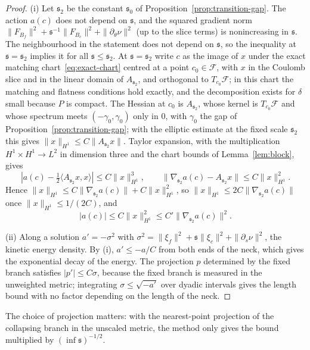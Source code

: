 \documentclass[11pt]{amsart}
\theoremstyle{definition}
\theoremstyle{remark}
\theoremstyle{plain}
\numberwithin{equation}{section}
\newcommand{\cF}{\mathcal{F}}
\begin{document}
\begin{proof}
(i) Let ${\mathfrak s}_2$ be the constant ${\mathfrak s}_0$ of Proposition~\ref{prop:transition-gap}.
The action $a(c)$ does not depend on ${\mathfrak s}$, and the squared gradient norm
$\|F_{B_f}\|^2+{\mathfrak s}^{-1}\|F_{B_c}\|^2+\|\partial_\theta\nu\|^2$ (up to the slice terms)
is nonincreasing in ${\mathfrak s}$. The neighbourhood in the statement does not depend on
${\mathfrak s}$, so the inequality at ${\mathfrak s}={\mathfrak s}_2$ implies it for all ${\mathfrak s}\le{\mathfrak s}_2$. At
${\mathfrak s}={\mathfrak s}_2$ write $c$ as the image of $x$ under the exact matching
chart~\eqref{eq:exact-chart} centred at a point $c_0\in\cF$, with $x$ in the Coulomb slice and in
the linear domain of $A_{{\mathfrak s}_2}$, and orthogonal to $T_{c_0}\cF$; in this chart the
matching and flatness conditions hold exactly, and the decomposition exists for $\delta$ small
because $P$ is compact. The Hessian at $c_0$ is $A_{{\mathfrak s}_2}$, whose kernel is
$T_{c_0}\cF$ and whose spectrum meets $(-\gamma_0,\gamma_0)$ only in $0$, with $\gamma_0$ the gap of
Proposition~\ref{prop:transition-gap}; with the elliptic estimate at the fixed scale
${\mathfrak s}_2$ this gives $\|x\|_{H^1}\le C\|A_{{\mathfrak s}_2}x\|$. Taylor expansion, with the
multiplication $H^1\times H^1\to L^2$ in dimension three and the chart bounds of
Lemma~\ref{lem:block}, gives
\[
|a(c)-\tfrac12\langle A_{{\mathfrak s}_2}x,x\rangle|\le C\|x\|_{H^1}^3,\qquad
\|\nabla_{{\mathfrak s}_2}a(c)-A_{{\mathfrak s}_2}x\|\le C\|x\|_{H^1}^2 .
\]
Hence $\|x\|_{H^1}\le C\|\nabla_{{\mathfrak s}_2}a(c)\|+C\|x\|_{H^1}^2$, so
$\|x\|_{H^1}\le2C\|\nabla_{{\mathfrak s}_2}a(c)\|$ once $\|x\|_{H^1}\le 1/(2C)$, and
\[
|a(c)|\le C\|x\|_{H^1}^2\le C'\|\nabla_{{\mathfrak s}_2}a(c)\|^2 .
\]

(ii) Along a solution $a'=-\sigma^2$ with
$\sigma^2=\|\xi_f\|^2+{\mathfrak s}\|\xi_c\|^2+\|\partial_s\nu\|^2$, the kinetic
energy density. By (i), $a'\le-a/C$ from both ends of the neck, which
gives the exponential decay of the energy. The projection $p$ determined
by the fixed branch satisfies $|p'|\le C\sigma$, because the fixed branch
is measured in the unweighted metric; integrating $\sigma\le\sqrt{-a'}$
over dyadic intervals gives the length bound with no factor depending on
the length of the neck.
\end{proof}

The choice of projection matters: with the nearest-point projection of
the collapsing branch in the unscaled metric, the method only gives the
bound multiplied by $(\inf{\mathfrak s})^{-1/2}$.
\end{document}
